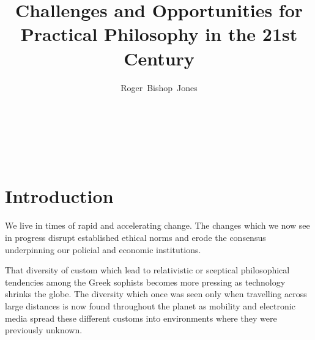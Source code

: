 \documentclass[14pt,titlepage]{extarticle}
\title{Challenges and Opportunities for Practical Philosophy in the 21st Century}
\author{Roger~Bishop~Jones}
\date{\ }
\newcommand{\ignore}[1]{}
\begin{document}

                               
\begin{titlepage}
\maketitle





\end{titlepage}

\ \

\ignore{
\begin{centering}
{\LARGE \bf Challenges \\for \\Practical Philosophy \\in \\the 21st Century\\}
\end{centering}
}%

\setcounter{tocdepth}{1}
{\parskip-0pt\tableofcontents}




\section{Introduction}

We live in times of rapid and accelerating change.
The changes which we now see in progress disrupt established ethical norms and erode the consensus underpinning our policial and economic institutions.

That diversity of custom which lead to relativistic or sceptical philosophical tendencies among the Greek sophists becomes more pressing as technology shrinks the globe.
The diversity which once was seen only when travelling across large distances is now found throughout the planet as mobility and electronic media spread these different customs into environments where they were previously unknown.
\end{document}
